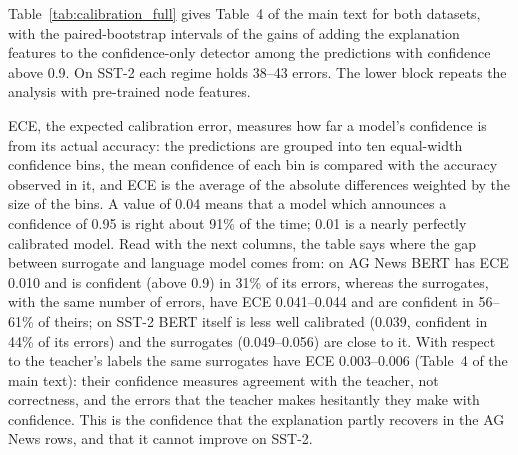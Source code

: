 \documentclass[review,12pt]{elsarticle}
\begin{document}
Table~\ref{tab:calibration_full} gives Table~4 of the main text for both datasets, with the paired-bootstrap intervals of the gains of adding the explanation features to the confidence-only detector among the predictions with confidence above 0.9. On SST-2 each regime holds 38--43 errors. The lower block repeats the analysis with pre-trained node features.

ECE, the expected calibration error, measures how far a model's confidence is from its actual accuracy: the predictions are grouped into ten equal-width confidence bins, the mean confidence of each bin is compared with the accuracy observed in it, and ECE is the average of the absolute differences weighted by the size of the bins. A value of 0.04 means that a model which announces a confidence of 0.95 is right about 91\% of the time; 0.01 is a nearly perfectly calibrated model. Read with the next columns, the table says where the gap between surrogate and language model comes from: on AG News BERT has ECE 0.010 and is confident (above 0.9) in 31\% of its errors, whereas the surrogates, with the same number of errors, have ECE 0.041--0.044 and are confident in 56--61\% of theirs; on SST-2 BERT itself is less well calibrated (0.039, confident in 44\% of its errors) and the surrogates (0.049--0.056) are close to it. With respect to the teacher's labels the same surrogates have ECE 0.003--0.006 (Table~4 of the main text): their confidence measures agreement with the teacher, not correctness, and the errors that the teacher makes hesitantly they make with confidence. This is the confidence that the explanation partly recovers in the AG News rows, and that it cannot improve on SST-2.

\begin{table}[H]
\centering
\scriptsize
\setlength{\tabcolsep}{3.5pt}
\caption{Calibration with respect to the gold labels and error detection among high-confidence predictions (confidence \(>0.9\)), with fine-tuned (upper block) and pre-trained (lower block) node features. \(\Delta\)AUROC and \(\Delta\)AUPRC: gain of adding the explanation features to the confidence-only detector within the regime (paired bootstrap, 95\% interval).}
\label{tab:calibration_full}
\end{table}
\end{document}
